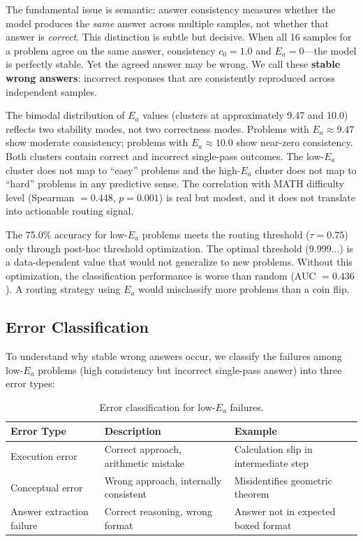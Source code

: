 \documentclass{article}
\begin{document}
The fundamental issue is semantic: answer consistency measures whether the model produces the \textit{same} answer across multiple samples, not whether that answer is \textit{correct}. This distinction is subtle but decisive. When all 16 samples for a problem agree on the same answer, consistency $c_0 = 1.0$ and $E_a = 0$---the model is perfectly stable. Yet the agreed answer may be wrong. We call these \textbf{stable wrong answers}: incorrect responses that are consistently reproduced across independent samples.

The bimodal distribution of $E_a$ values (clusters at approximately 9.47 and 10.0) reflects two stability modes, not two correctness modes. Problems with $E_a \approx 9.47$ show moderate consistency; problems with $E_a \approx 10.0$ show near-zero consistency. Both clusters contain correct and incorrect single-pass outcomes. The low-$E_a$ cluster does not map to ``easy'' problems and the high-$E_a$ cluster does not map to ``hard'' problems in any predictive sense. The correlation with MATH difficulty level (Spearman $= 0.448$, $p = 0.001$) is real but modest, and it does not translate into actionable routing signal.

The 75.0\% accuracy for low-$E_a$ problems meets the routing threshold ($\tau = 0.75$) only through post-hoc threshold optimization. The optimal threshold (9.999...) is a data-dependent value that would not generalize to new problems. Without this optimization, the classification performance is worse than random (AUC $= 0.436$). A routing strategy using $E_a$ would misclassify more problems than a coin flip.

\subsection{Error Classification}

To understand why stable wrong answers occur, we classify the failures among low-$E_a$ problems (high consistency but incorrect single-pass answer) into three error types:

\begin{table}[t]
\caption{Error classification for low-$E_a$ failures.}
\label{tab:errors}
\centering
\begin{tabular}{lll}
\toprule
Error Type & Description & Example \\
\midrule
Execution error & Correct approach, arithmetic mistake & Calculation slip in intermediate step \\
Conceptual error & Wrong approach, internally consistent & Misidentifies geometric theorem \\
Answer extraction failure & Correct reasoning, wrong format & Answer not in expected boxed format \\
\bottomrule
\end{tabular}
\end{table}
\end{document}
